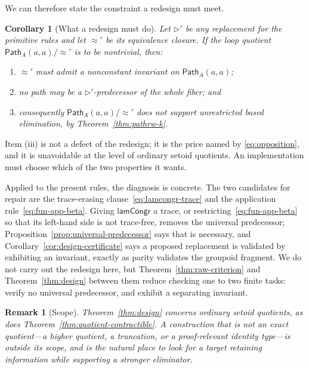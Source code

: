 \documentclass[10pt,reqno]{amsart}
\newtheorem{corollary}[theorem]{Corollary}
\newtheorem{remark}[theorem]{Remark}
\newcommand{\PathTy}{\mathsf{Path}}
\begin{document}
We can therefore state the constraint a redesign must meet.

\begin{corollary}[What a redesign must do]
\label{cor:redesign}
Let \(\triangleright'\) be any replacement for the primitive rules and let
\(\approx'\) be its equivalence closure.  If the loop quotient
\(\PathTy_A(a,a)/{\approx'}\) is to be nontrivial, then:
\begin{enumerate}[label=(\roman*),itemsep=1pt,topsep=3pt]
\item \(\approx'\) must admit a nonconstant invariant on \(\PathTy_A(a,a)\);
\item no path may be a \(\triangleright'\)-predecessor of the whole fiber; and
\item consequently \(\PathTy_A(a,a)/{\approx'}\) does \emph{not} support
  unrestricted based elimination, by Theorem~\ref{thm:pathrw-k}.
\end{enumerate}
\end{corollary}

Item (iii) is not a defect of the redesign; it is the price named by
\eqref{eq:opposition}, and it is unavoidable at the level of ordinary setoid
quotients.  An implementation must choose which of the two properties it wants.

Applied to the present rules, the diagnosis is concrete.  The two candidates for
repair are the trace-erasing clause~\eqref{eq:lamcongr-trace} and the
application rule~\eqref{eq:fun-app-beta}.  Giving \(\mathsf{lamCongr}\) a trace,
or restricting~\eqref{eq:fun-app-beta} so that its left-hand side is not
trace-free, removes the universal predecessor;
Proposition~\ref{prop:universal-predecessor} says that is necessary, and
Corollary~\ref{cor:design-certificate} says a proposed replacement is validated
by exhibiting an invariant, exactly as parity validates the groupoid fragment.
We do not carry out the redesign here, but Theorem~\ref{thm:raw-criterion} and
Theorem~\ref{thm:design} between them reduce checking one to two finite tasks:
verify no universal predecessor, and exhibit a separating invariant.

\begin{remark}[Scope]
\label{rem:design-scope}
Theorem~\ref{thm:design} concerns ordinary setoid quotients, as does
Theorem~\ref{thm:quotient-contractible}.  A construction that is not an exact
quotient---a higher quotient, a truncation, or a proof-relevant identity
type---is outside its scope, and is the natural place to look for a target
retaining information while supporting a stronger eliminator.
\end{remark}
\end{document}
